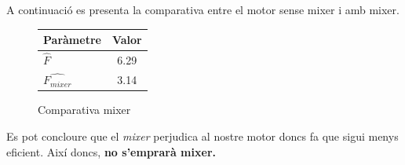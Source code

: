 A continuació es presenta la comparativa entre el motor sense mixer i amb mixer.
\begin{figure}[H]
	\centering
	\begin{tabular}{lc}
		\toprule[3pt]
		\textbf{Paràmetre}&\textbf{Valor}\\
		\midrule[1pt]
		$\hat{F}$ & 6.29 \\
		$\hat{F_{mixer}}$ & 3.14 \\
		\bottomrule[2pt]
	\end{tabular}
	\label{C_opti2}
	\caption{Comparativa mixer}
\end{figure}
Es pot concloure que el\textit{ mixer} perjudica al nostre motor doncs fa que sigui menys eficient. Així doncs,\textbf{ no s'emprarà mixer.}